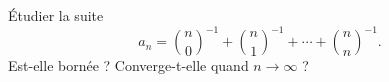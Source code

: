 Étudier la suite
\[ a_n = \binom{n}{0}^{-1} + \binom{n}{1}^{-1} + \cdots + \binom{n}{n}^{-1}. \]
Est-elle bornée ? Converge-t-elle quand $n \to \infty$ ?
